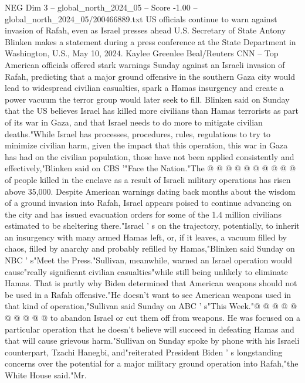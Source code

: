 \begin{textsample}{NEG Dim 3 – global\_north\_2024\_05 – Score -1.00 – global\_north\_2024\_05/200466889.txt}  \label{ex:f3_neg_447}
US officials continue to warn against invasion of Rafah, even as Israel presses ahead U.S.
Secretary of State Antony Blinken makes a statement during a press conference at the State Department in Washington, U.S., May 10, 2024.
Kaylee Greenlee Beal/Reuters CNN -- Top American officials offered stark warnings Sunday against an Israeli invasion of Rafah, predicting that a major ground offensive in the southern Gaza city would lead to widespread civilian casualties, spark a Hamas insurgency and create a power vacuum the terror group would later seek to fill.
Blinken said on Sunday that the US believes Israel has killed more civilians than Hamas terrorists as part of its war in Gaza, and that Israel needs to do more to mitigate civilian deaths."While Israel has processes, procedures, rules, regulations to try to minimize civilian harm, given the impact that this operation, this war in Gaza has had on the civilian population, those have not been applied consistently and effectively,"Blinken said on CBS '"Face the Nation."The @ @ @ @ @ @ @ @ @ @ of people killed in the enclave as a result of Israeli military operations has risen above 35,000.
Despite American warnings dating back months about the wisdom of a ground invasion into Rafah, Israel appears poised to continue advancing on the city and has issued evacuation orders for some of the 1.4 million civilians estimated to be sheltering there."Israel ' s on the trajectory, potentially, to inherit an insurgency with many armed Hamas left, or, if it leaves, a vacuum filled by chaos, filled by anarchy and probably refilled by Hamas,"Blinken said Sunday on NBC ' s"Meet the Press."Sullivan, meanwhile, warned an Israel operation would cause"really significant civilian casualties"while still being unlikely to eliminate Hamas.
That is partly why Biden determined that American weapons should not be used in a Rafah offensive."He doesn't want to see American weapons used in that kind of operation,"Sullivan said Sunday on ABC ' s"This Week."@ @ @ @ @ @ @ @ @ @ to abandon Israel or cut them off from weapons.
He was focused on a particular operation that he doesn't believe will succeed in defeating Hamas and that will cause grievous harm."Sullivan on Sunday spoke by phone with his Israeli counterpart, Tzachi Hanegbi, and"reiterated President Biden ' s longstanding concerns over the potential for a major military ground operation into Rafah,"the White House said."Mr.

\end{textsample}
